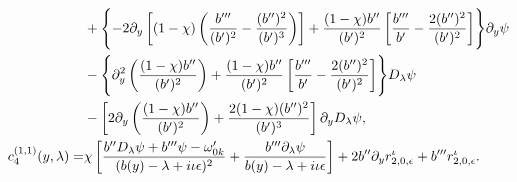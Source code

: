 \documentclass[reqno,11pt]{amsart}
\numberwithin{equation}{section}
\numberwithin{equation}{section} %
\begin{document}
\begin{enumerate}
\begin{align}
 &+\Biggl\{-2\partial_y\left[(1-\chi)
        \left(\frac{b'''}{(b')^2}-\frac{(b'')^2}{(b')^3}\right)\right]+\frac{(1-\chi)b''}{(b')^2}
        \left[\frac{b'''}{b'}-\frac{2(b'')^2}{(b')^2}\right]
        \Biggr\}\partial_y\psi\notag\\
 &-\Biggl\{\partial_y^2\left(\frac{(1-\chi)b''}{(b')^2}\right)
        +\frac{(1-\chi)b''}{(b')^2}
        \left[\frac{b'''}{b'}-\frac{2(b'')^2}{(b')^2}\right]
        \Biggr\}D_\lambda\psi\notag\\
 &-\left[2\partial_y\left(\frac{(1-\chi)b''}{(b')^2}\right)
        +\frac{2(1-\chi)(b'')^2}{(b')^3}\right]\partial_yD_\lambda\psi,\notag\\
        c_4^{(1,1)}(y,\lambda)=
        &\chi\left[\frac{b''D_\lambda\psi+b'''\psi-\omega_{0k}'}{(b(y)-\lambda+i\iota\epsilon)^2}+\frac{ b'''\partial_\lambda\psi}{b(y)-\lambda+i\iota\epsilon}
        \right]+2b''\partial_y r_{2,0,\epsilon}^{\iota}
        +b'''r_{2,0,\epsilon}^{\iota}.\notag
    \end{align}

\end{enumerate}
\end{document}
